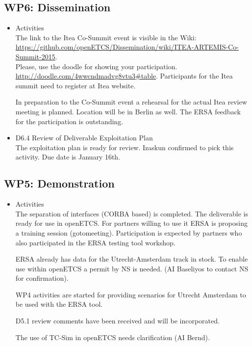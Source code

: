 \documentclass[a4paper, 11pt]{article}
\begin{document}
\subsection{WP6: Dissemination}
\begin{itemize}
\item Activities\\
The link to the Itea Co-Summit event is visible in the Wiki:
\url{https://github.com/openETCS/Dissemination/wiki/ITEA-ARTEMIS-Co-Summit-2015}.\\
 Please, use the doodle for showing your participation.
\url{http://doodle.com/4wwcndmadvg8vtu3#table}. Participants for the Itea summit need to register at Itea website.

In preparation to the Co-Summit event a rehearsal for the actual Itea review meeting is planned. Location will be in Berlin as well. The ERSA feedback for the participation is outstanding.

\item D6.4 Review of Deliverable Exploitation Plan\\
The exploitation plan is ready for review. Izaskun confirmed to pick this activity. Due date is January 16th.

\end{itemize}

\subsection{WP5: Demonstration}
\begin{itemize}
\item Activities\\
The separation of interfaces (CORBA based) is completed. The deliverable is ready for use in openETCS.
For partners willing to use it ERSA is proposing a training session (gotomeeting). Participation is expected by partners who also participated in the ERSA testing tool workshop.

ERSA already has data for the Utrecht-Amsterdam track in stock. To enable use within openETCS a permit by NS is needed. (AI Baseliyos to contact NS for confirmation).

WP4 activities are started for providing scenarios for Utrecht Amsterdam to be used with the ERSA tool.

D5.1 review comments have been received and will be incorporated.

The use of TC-Sim in openETCS needs clarification (AI Bernd).
 
\end{itemize}
\end{document}
